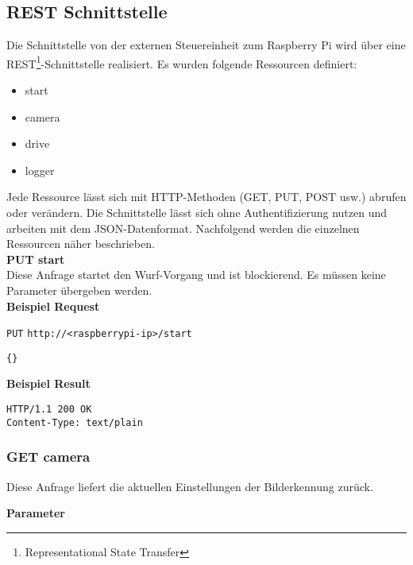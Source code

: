 \subsection{REST Schnittstelle}
\label{sec:rest-schnittstelle}

Die Schnittstelle von der externen Steuereinheit zum Raspberry Pi wird über eine REST\footnote{Representational State Transfer}-Schnittstelle realisiert. Es wurden folgende Ressourcen definiert:
\begin{itemize}
	\item start
	\item camera
	\item drive
	\item logger
\end{itemize}
Jede Ressource lässt sich mit HTTP-Methoden (GET, PUT, POST usw.) abrufen oder verändern. Die Schnittstelle lässt sich ohne Authentifizierung nutzen und arbeiten mit dem JSON-Datenformat. Nachfolgend werden die einzelnen Ressourcen näher beschrieben.\\

\noindent
\textbf{PUT start}\\
Diese Anfrage startet den Wurf-Vorgang und ist blockierend. Es müssen keine Parameter übergeben werden.\\
 
\textbf{Beispiel Request}

\texttt{PUT}
\texttt{http://<raspberrypi-ip>/start}

\begin{lstlisting}[caption=PUT start Request, tabsize=2]
{}
\end{lstlisting}

\textbf{Beispiel Result}

\begin{lstlisting}[caption=PUT start Response, tabsize=2]
HTTP/1.1 200 OK
Content-Type: text/plain
\end{lstlisting}





\subsubsection{GET camera}
Diese Anfrage liefert die aktuellen Einstellungen der Bilderkennung zurück.\\
\label{sec:parameter-bild-erkennung}

\textbf{Parameter}

